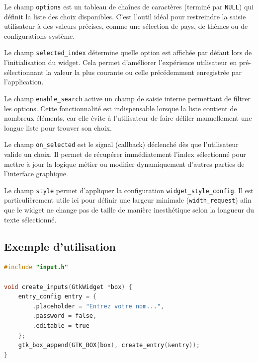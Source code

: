 \bigskip

Le champ \texttt{options} est un tableau de chaînes de caractères (terminé par \texttt{NULL}) qui définit la liste des choix disponibles. C'est l'outil idéal pour restreindre la saisie utilisateur à des valeurs précises, comme une sélection de pays, de thèmes ou de configurations système.

Le champ \texttt{selected\_index} détermine quelle option est affichée par défaut lors de l'initialisation du widget. Cela permet d'améliorer l'expérience utilisateur en pré-sélectionnant la valeur la plus courante ou celle précédemment enregistrée par l'application.

Le champ \texttt{enable\_search} active un champ de saisie interne permettant de filtrer les options. Cette fonctionnalité est indispensable lorsque la liste contient de nombreux éléments, car elle évite à l'utilisateur de faire défiler manuellement une longue liste pour trouver son choix.

Le champ \texttt{on\_selected} est le signal (callback) déclenché dès que l'utilisateur valide un choix. Il permet de récupérer immédiatement l'index sélectionné pour mettre à jour la logique métier ou modifier dynamiquement d'autres parties de l'interface graphique.

Le champ \texttt{style} permet d'appliquer la configuration \texttt{widget\_style\_config}. Il est particulièrement utile ici pour définir une largeur minimale (\texttt{width\_request}) afin que le widget ne change pas de taille de manière inesthétique selon la longueur du texte sélectionné.

\bigskip

\subsection{Exemple d'utilisation}
\begin{lstlisting}[language=C]
#include "input.h"

void create_inputs(GtkWidget *box) {
    entry_config entry = {
        .placeholder = "Entrez votre nom...",
        .password = false,
        .editable = true
    };
    gtk_box_append(GTK_BOX(box), create_entry(&entry));
}
\end{lstlisting}
